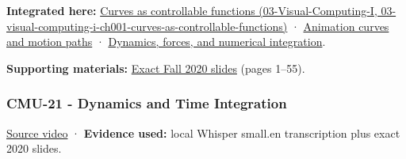 \textbf{Integrated here:} \href{../03-Visual-Computing-I/main.pdf\#nameddest=03-visual-computing-i-ch001-curves-as-controllable-functions}{Curves as controllable functions (03-Visual-Computing-I, 03-visual-computing-i-ch001-curves-as-controllable-functions)} · \hyperref[04-visual-computing-ii-ch029-animation-curves-and-motion-paths]{Animation curves and motion paths} · \hyperref[04-visual-computing-ii-ch029-dynamics-forces-and-numerical-integration]{Dynamics, forces, and numerical integration}.

\textbf{Supporting materials:} \href{https://15462.courses.cs.cmu.edu/fall2020content/lectures/20_introanimation/20_introanimation_slides.pdf}{Exact Fall 2020 slides} (pages 1--55).

\subsubsection{CMU-21 - Dynamics and Time Integration}\label{04-visual-computing-ii-ch036-cmu-21---dynamics-and-time-integration}

\href{https://www.youtube.com/watch?v=Fi9xu3z97W4}{Source video} · \textbf{Evidence used:} local Whisper small.en transcription plus exact 2020 slides.

